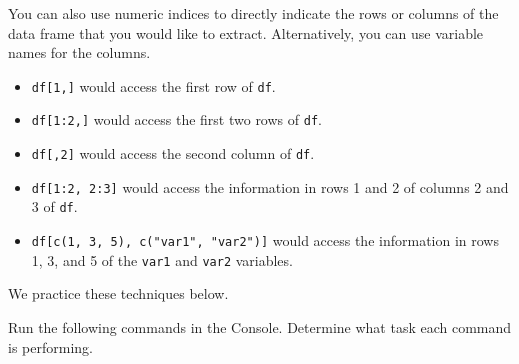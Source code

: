 \documentclass[
]{book}
\newenvironment{Shaded}{\begin{snugshade}}{\end{snugshade}}
\newcommand{\AttributeTok}[1]{\textcolor[rgb]{0.77,0.63,0.00}{#1}}
\newcommand{\CommentTok}[1]{\textcolor[rgb]{0.56,0.35,0.01}{\textit{#1}}}
\newcommand{\ConstantTok}[1]{\textcolor[rgb]{0.00,0.00,0.00}{#1}}
\newcommand{\DecValTok}[1]{\textcolor[rgb]{0.00,0.00,0.81}{#1}}
\newcommand{\FunctionTok}[1]{\textcolor[rgb]{0.00,0.00,0.00}{#1}}
\newcommand{\NormalTok}[1]{#1}
\newcommand{\OtherTok}[1]{\textcolor[rgb]{0.56,0.35,0.01}{#1}}
\newcommand{\SpecialCharTok}[1]{\textcolor[rgb]{0.00,0.00,0.00}{#1}}
\newcommand{\StringTok}[1]{\textcolor[rgb]{0.31,0.60,0.02}{#1}}
\providecommand{\tightlist}{%
  \setlength{\itemsep}{0pt}\setlength{\parskip}{0pt}}
\theoremstyle{definition}
\theoremstyle{definition}
\theoremstyle{definition}
\theoremstyle{definition}
\theoremstyle{remark}
\begin{document}
You can also use numeric indices to directly indicate the rows or columns of the data frame that you would like to extract. Alternatively, you can use variable names for the columns.

\begin{itemize}
\tightlist
\item
  \texttt{df{[}1,{]}} would access the first row of \texttt{df}.
\item
  \texttt{df{[}1:2,{]}} would access the first two rows of \texttt{df}.
\item
  \texttt{df{[},2{]}} would access the second column of \texttt{df}.
\item
  \texttt{df{[}1:2,\ 2:3{]}} would access the information in rows 1 and 2 of columns 2 and 3 of \texttt{df}.
\item
  \texttt{df{[}c(1,\ 3,\ 5),\ c("var1",\ "var2"){]}} would access the information in rows 1, 3, and 5 of the \texttt{var1} and \texttt{var2} variables.
\end{itemize}

We practice these techniques below.

\begin{yourturn}

Run the following commands in the Console. Determine what task each command is performing.

\begin{Shaded}
\end{Shaded}

\end{yourturn}
\end{document}
